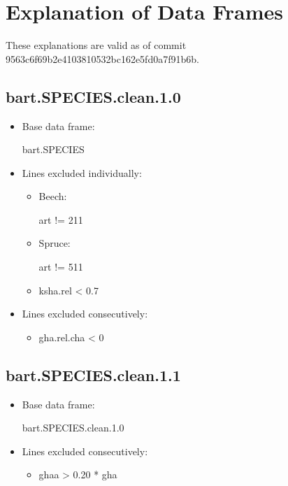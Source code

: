 \section{Explanation of Data Frames}

These explanations are valid as of commit 9563c6f69b2e4103810532bc162e5fd0a7f91b6b.

\subsection{bart.SPECIES.clean.1.0}

\begin{itemize}
\item Base data frame: \begin{rcode} bart.SPECIES \end{rcode}
\item Lines excluded individually:
  \begin{itemize}
  \item Beech: \begin{rcode} art != 211 \end{rcode}
  \item Spruce: \begin{rcode} art != 511 \end{rcode}
  \item \begin{rcode} ksha.rel < 0.7 \end{rcode}
  \end{itemize}
\item Lines excluded consecutively:
  \begin{itemize}
  \item \begin{rcode} gha.rel.cha < 0 \end{rcode}
  \end{itemize}
\end{itemize}

\subsection{bart.SPECIES.clean.1.1}

\begin{itemize}
\item Base data frame: \begin{rcode} bart.SPECIES.clean.1.0 \end{rcode}
\item Lines excluded consecutively:
  \begin{itemize}
  \item \begin{rcode} ghaa > 0.20 * gha \end{rcode}
  \end{itemize}
\end{itemize}

